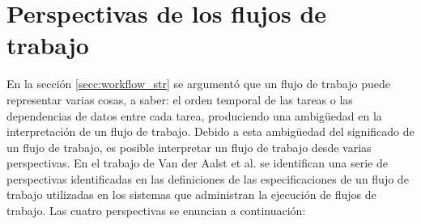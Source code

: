 \section{Perspectivas de los flujos de trabajo}
En la sección \ref{secc:workflow_str} se argumentó que un flujo de trabajo puede representar varias cosas, a saber: el orden temporal de las tareas o las dependencias de datos entre cada tarea, produciendo una ambigüedad en la interpretación de un flujo de trabajo. Debido a esta ambigüedad del significado de un flujo de trabajo, es posible interpretar un flujo de trabajo desde varias perspectivas. En el trabajo de Van der Aalst et al. \cite{van2003workflow} se identifican una serie de perspectivas identificadas en las definiciones de las especificaciones de un flujo de trabajo utilizadas en los sistemas que administran la ejecución de flujos de trabajo. Las cuatro perspectivas se enuncian a continuación:

